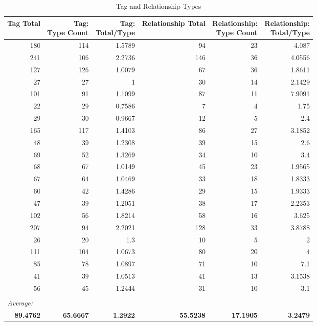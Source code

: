\begin{table}[!htbp]
  \centering
  \caption{Tag and Relationship Types}\label{table:tag_relationship_types} 
    \begin{tabular}{rrrrrr}
    \toprule
    Tag Total & \specialcell[t]{Tag:\\Type Count} & \specialcell[t]{Tag:\\Total/Type} & Relationship Total & \specialcell[t]{Relationship:\\Type Count} & \specialcell[t]{Relationship:\\Total/Type} \\
    \midrule
    180   & 114   & 1.5789 & 94    & 23    & 4.087 \\
    241   & 106   & 2.2736 & 146   & 36    & 4.0556 \\
    127   & 126   & 1.0079 & 67    & 36    & 1.8611 \\
    27    & 27    & 1     & 30    & 14    & 2.1429 \\
    101   & 91    & 1.1099 & 87    & 11    & 7.9091 \\
    22    & 29    & 0.7586 & 7     & 4     & 1.75 \\
    29    & 30    & 0.9667 & 12    & 5     & 2.4 \\
    165   & 117   & 1.4103 & 86    & 27    & 3.1852 \\
    48    & 39    & 1.2308 & 39    & 15    & 2.6 \\
    69    & 52    & 1.3269 & 34    & 10    & 3.4 \\
    68    & 67    & 1.0149 & 45    & 23    & 1.9565 \\
    67    & 64    & 1.0469 & 33    & 18    & 1.8333 \\
    60    & 42    & 1.4286 & 29    & 15    & 1.9333 \\
    47    & 39    & 1.2051 & 38    & 17    & 2.2353 \\
    102   & 56    & 1.8214 & 58    & 16    & 3.625 \\
    207   & 94    & 2.2021 & 128   & 33    & 3.8788 \\
    26    & 20    & 1.3   & 10    & 5     & 2 \\
    111   & 104   & 1.0673 & 80    & 20    & 4 \\
    85    & 78    & 1.0897 & 71    & 10    & 7.1 \\
    41    & 39    & 1.0513 & 41    & 13    & 3.1538 \\
    56    & 45    & 1.2444 & 31    & 10    & 3.1 \\
          &       &       &       &       &  \\
          \multicolumn{6}{l}{\textit{Average:}} \\ 
    \textbf{89.4762} & \textbf{65.6667} & \textbf{1.2922} & \textbf{55.5238} & \textbf{17.1905} & \textbf{3.2479} \\
    \bottomrule
    \end{tabular}%
  \label{tab:addlabel}%
\end{table}%

